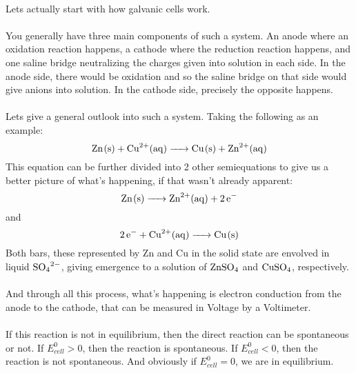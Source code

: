 \documentclass[12pt,  letterpaper]{article}
\begin{document}
\paragraph*{}
Lets actually start with how galvanic cells work.
\paragraph*{}
You generally have three main components of such a system. An anode where an oxidation reaction happens, a cathode where the reduction reaction happens, and one saline bridge neutralizing the charges given into solution in each side. In the anode side, there would be oxidation and so the saline bridge on that side would give anions into solution. In the cathode side, precisely the opposite happens.
\paragraph*{}
Lets give a general outlook into such a system. Taking the following as an example:
\begin{equation}
\ce{Zn(s) + Cu^{2+}(aq) -> Cu(s) + Zn^{2+}(aq)}
\end{equation}
This equation can be further divided into 2 other semiequations to give us a better picture of what's happening, if that wasn't already apparent:
\begin{equation}
\ce{Zn(s) -> Zn^{2+}(aq) + 2e^{-}}
\end{equation}
and 
\begin{equation}
\ce{2e^{-} + Cu^{2+}(aq) -> Cu(s)}
\end{equation}
Both bars, these represented by Zn and Cu in the solid state are envolved in liquid $\ce{SO_{4}^{2-}}$, giving emergence to a solution of $\ce{ZnSO_{4}}$ and $\ce{CuSO_{4}}$, respectively.
\paragraph*{}
And through all this process, what's happening is electron conduction from the anode to the cathode, that can be measured in Voltage by a Voltimeter.\paragraph*{}
If this reaction is not in equilibrium, then the direct reaction can be spontaneous or not. If $E_{cell}^{0} > 0$, then the reaction is spontaneous. If $E_{cell}^{0} < 0$, then the reaction is not spontaneous. And obviously if $E_{cell}^{0} = 0$, we are in equilibrium.
\end{document}
